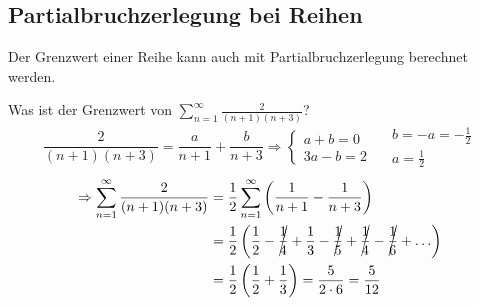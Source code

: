 \subsection{Partialbruchzerlegung bei Reihen}

\noindent Der Grenzwert einer Reihe kann auch mit Partialbruchzerlegung berechnet werden.
\begin{example}
    Was ist der Grenzwert von $\sum_{n=1}^\infty \frac{2}{(n+1)(n+3)}$?
    \tcblower
    \begin{equation*}
        \frac{2}{(n+1)(n+3)} = \frac{a}{n+1} + \frac{b}{n+3} \Rightarrow \begin{cases}
            a + b = 0\\
            3a - b = 2
        \end{cases}
        \quad
        \begin{matrix}
            b = -a = -\frac{1}{2}\\
            a = \frac{1}{2}
        \end{matrix}
    \end{equation*}
    \begin{align*}
        \Rightarrow \sum_{n=1}^\infty \frac{2}{(n+1)(n+3)} &= \frac{1}{2}\sum_{n=1}^\infty\left(\frac{1}{n+1} - \frac{1}{n+3}\right)\\
        & = \frac{1}{2}\left(\frac{1}{2} - \cancel{\frac{1}{4}} + \frac{1}{3} - \cancel{\frac{1}{5}} + \cancel{\frac{1}{4}} - \cancel{\frac{1}{6}} + \ldots\right)\\
        &= \frac{1}{2}\left(\frac{1}{2} + \frac{1}{3}\right) = \frac{5}{2 \cdot 6} = \frac{5}{12}
    \end{align*}
\end{example}
